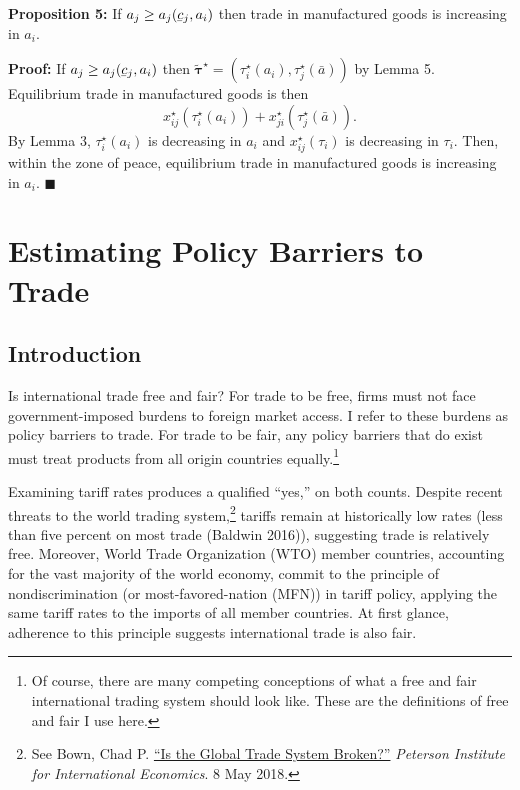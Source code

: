 \documentclass{puthesis}
\DeclareRobustCommand{\ubar}[1]{\underaccent{\bar}{#1}}
\begin{document}
\textbf{Proposition 5:} If \(a_j \geq a_j(\ubar{c}_j, a_i)\) then trade
in manufactured goods is increasing in \(a_i\).

\textbf{Proof:} If \(a_j \geq a_j(\ubar{c}_j, a_i)\) then
\(\tilde{\bm{\tau}}^\star = \left( \tau_i^\star(a_i), \tau_j^\star(\bar{a}) \right)\)
by Lemma 5. Equilibrium trade in manufactured goods is then \[
x_{ij}^\star(\tau_i^\star(a_i)) + x_{ji}^\star(\tau_j^\star(\bar{a})) .
\] By Lemma 3, \(\tau_i^\star(a_i)\) is decreasing in \(a_i\) and
\(x_{ij}^\star(\tau_i)\) is decreasing in \(\tau_i\). Then, within the
zone of peace, equilibrium trade in manufactured goods is increasing in
\(a_i\). \(\blacksquare\)

\clearpage

\chapter{Estimating Policy Barriers to Trade}

\section{Introduction}

Is international trade free and fair? For trade to be free, firms must
not face government-imposed burdens to foreign market access. I refer to
these burdens as policy barriers to trade. For trade to be fair, any
policy barriers that do exist must treat products from all origin
countries equally.\footnote{Of course, there are many competing
  conceptions of what a free and fair international trading system
  should look like. These are the definitions of free and fair I use
  here.}

Examining tariff rates produces a qualified ``yes,'' on both counts.
Despite recent threats to the world trading system,\footnote{See Bown,
  Chad P.
  \href{https://piie.com/commentary/op-eds/global-trade-system-broken}{``Is
  the Global Trade System Broken?''} \emph{Peterson Institute for
  International Economics}. 8 May 2018.} tariffs remain at historically
low rates (less than five percent on most trade (Baldwin 2016)),
suggesting trade is relatively free. Moreover, World Trade Organization
(WTO) member countries, accounting for the vast majority of the world
economy, commit to the principle of nondiscrimination (or
most-favored-nation (MFN)) in tariff policy, applying the same tariff
rates to the imports of all member countries. At first glance, adherence
to this principle suggests international trade is also fair.
\end{document}
